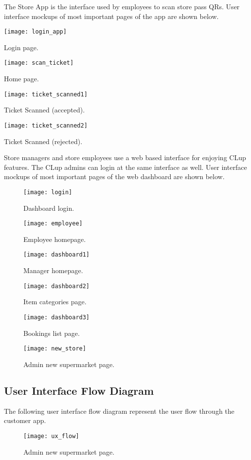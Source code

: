 \clearpage
The Store App is the interface used by employees to scan store pass QRs.
User interface mockups of most important pages of the app are shown below.
\vspace{0.5cm}

\begin{minipage}{.5\textwidth}
	\centering
	\texttt{[image: login\_app]}
	\captionsetup{type=figure}
	\caption{Login page.}
\end{minipage}%
\begin{minipage}{.5\textwidth}
	\centering
	\texttt{[image: scan\_ticket]}
	\captionsetup{type=figure}
	\caption{Home page.}
\end{minipage}

\vspace{1cm}

\begin{minipage}{.5\textwidth}
	\centering
	\texttt{[image: ticket\_scanned1]}
	\captionsetup{type=figure}
	\caption{Ticket Scanned (accepted).}
\end{minipage}%
\begin{minipage}{.5\textwidth}
	\centering
	\texttt{[image: ticket\_scanned2]}
	\captionsetup{type=figure}
	\caption{Ticket Scanned (rejected).}
\end{minipage}

\clearpage

Store managers and store employees use a web based interface for enjoying CLup features. The CLup admins can login at the same interface as well.
User interface mockups of most important pages of the web dashboard are shown below.
\vspace{0.5cm}
\begin{figure}[H]
	\centering
	\texttt{[image: login]}
	\caption{Dashboard login.}
\end{figure}
\begin{figure}[H]
	\centering
	\texttt{[image: employee]}
	\caption{Employee homepage.}
\end{figure}
\begin{figure}[H]
	\centering
	\texttt{[image: dashboard1]}
	\caption{Manager homepage.}
\end{figure}
\begin{figure}[H]
	\centering
	\texttt{[image: dashboard2]}
	\caption{Item categories page.}
\end{figure}
\begin{figure}[H]
	\centering
	\texttt{[image: dashboard3]}
	\caption{Bookings list page.}
\end{figure}
\begin{figure}[H]
	\centering
	\texttt{[image: new\_store]}
	\caption{Admin new supermarket page.}
\end{figure}

\clearpage

\subsection{User Interface Flow Diagram}
The following user interface flow diagram represent the user flow through the customer app.
\begin{figure}[H]
	\centering
	\texttt{[image: ux\_flow]}
	\caption{Admin new supermarket page.}
\end{figure}